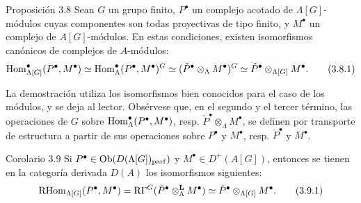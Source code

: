 \begin{statement}{Proposición 3.8}
Sean $G$ un grupo finito, $P^\bullet$ un complejo acotado de $\Lambda[G]$-módulos cuyas componentes son todas proyectivas de tipo finito, y $M^\bullet$ un complejo de $A[G]$-módulos. En estas condiciones, existen isomorfismos canónicos de complejos de $A$-módulos:
\[
\operatorname{Hom}_{\Lambda[G]}^\bullet(P^\bullet,M^\bullet)
\simeq \operatorname{Hom}_\Lambda^\bullet(P^\bullet,M^\bullet)^G
\simeq (\check P^\bullet\otimes_\Lambda M^\bullet)^G
\simeq \check P^\bullet\otimes_{\Lambda[G]}M^\bullet.
\tag{3.8.1}
\]
\end{statement}

La demostración utiliza los isomorfismos bien conocidos para el caso de los módulos, y se deja al lector. Obsérvese que, en el segundo y el tercer término, las operaciones de $G$ sobre $\operatorname{Hom}_\Lambda^\bullet(P^\bullet,M^\bullet)$, resp. $\check P^\bullet\otimes_\Lambda M^\bullet$, se definen por transporte de estructura a partir de sus operaciones sobre $P^\bullet$ y $M^\bullet$, resp. $\check P^\bullet$ y $M^\bullet$.

\begin{statement}{Corolario 3.9}
Si $P^\bullet\in \operatorname{Ob}(D(\Lambda[G])_{\mathrm{parf}})$ y $M^\bullet\in D^+(A[G])$, entonces se tienen en la categoría derivada $D(A)$ los isomorfismos siguientes:
\[
\mathrm{RHom}_{\Lambda[G]}(P^\bullet,M^\bullet)
=\mathrm{R}\Gamma^G(\check P^\bullet\otimes_\Lambda^{\mathbf L}M^\bullet)
\simeq \check P^\bullet\otimes_{\Lambda[G]}M^\bullet.
\tag{3.9.1}
\]
\end{statement}
